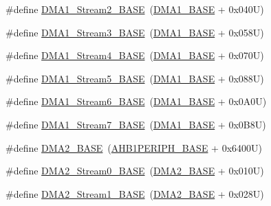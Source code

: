 \begin{DoxyCompactItemize}
\item 
\#define \hyperlink{group___peripheral__memory__map_ga48a551ee91d3f07dd74347fdb35c703d}{D\+M\+A1\+\_\+\+Stream2\+\_\+\+B\+A\+SE}~(\hyperlink{group___peripheral__memory__map_gab2d8a917a0e4ea99a22ac6ebf279bc72}{D\+M\+A1\+\_\+\+B\+A\+SE} + 0x040\+U)
\item 
\#define \hyperlink{group___peripheral__memory__map_gac51deb54ff7cfe1290dfcf517ae67127}{D\+M\+A1\+\_\+\+Stream3\+\_\+\+B\+A\+SE}~(\hyperlink{group___peripheral__memory__map_gab2d8a917a0e4ea99a22ac6ebf279bc72}{D\+M\+A1\+\_\+\+B\+A\+SE} + 0x058\+U)
\item 
\#define \hyperlink{group___peripheral__memory__map_ga757a3c0d866c0fe68c6176156065a26b}{D\+M\+A1\+\_\+\+Stream4\+\_\+\+B\+A\+SE}~(\hyperlink{group___peripheral__memory__map_gab2d8a917a0e4ea99a22ac6ebf279bc72}{D\+M\+A1\+\_\+\+B\+A\+SE} + 0x070\+U)
\item 
\#define \hyperlink{group___peripheral__memory__map_ga0ded7bed8969fe2e2d616e7f90eb7654}{D\+M\+A1\+\_\+\+Stream5\+\_\+\+B\+A\+SE}~(\hyperlink{group___peripheral__memory__map_gab2d8a917a0e4ea99a22ac6ebf279bc72}{D\+M\+A1\+\_\+\+B\+A\+SE} + 0x088\+U)
\item 
\#define \hyperlink{group___peripheral__memory__map_ga58998ddc40adb6361704d6c9dad08125}{D\+M\+A1\+\_\+\+Stream6\+\_\+\+B\+A\+SE}~(\hyperlink{group___peripheral__memory__map_gab2d8a917a0e4ea99a22ac6ebf279bc72}{D\+M\+A1\+\_\+\+B\+A\+SE} + 0x0\+A0\+U)
\item 
\#define \hyperlink{group___peripheral__memory__map_ga82186dd6d3f60995d428b34c041919d7}{D\+M\+A1\+\_\+\+Stream7\+\_\+\+B\+A\+SE}~(\hyperlink{group___peripheral__memory__map_gab2d8a917a0e4ea99a22ac6ebf279bc72}{D\+M\+A1\+\_\+\+B\+A\+SE} + 0x0\+B8\+U)
\item 
\#define \hyperlink{group___peripheral__memory__map_gab72a9ae145053ee13d1d491fb5c1df64}{D\+M\+A2\+\_\+\+B\+A\+SE}~(\hyperlink{group___peripheral__memory__map_ga811a9a4ca17f0a50354a9169541d56c4}{A\+H\+B1\+P\+E\+R\+I\+P\+H\+\_\+\+B\+A\+SE} + 0x6400\+U)
\item 
\#define \hyperlink{group___peripheral__memory__map_gac4c67b24726ba6b94d03adb351bcec4d}{D\+M\+A2\+\_\+\+Stream0\+\_\+\+B\+A\+SE}~(\hyperlink{group___peripheral__memory__map_gab72a9ae145053ee13d1d491fb5c1df64}{D\+M\+A2\+\_\+\+B\+A\+SE} + 0x010\+U)
\item 
\#define \hyperlink{group___peripheral__memory__map_ga35512bdc3f5e9df4557c2fbe7935d0b1}{D\+M\+A2\+\_\+\+Stream1\+\_\+\+B\+A\+SE}~(\hyperlink{group___peripheral__memory__map_gab72a9ae145053ee13d1d491fb5c1df64}{D\+M\+A2\+\_\+\+B\+A\+SE} + 0x028\+U)

\end{DoxyCompactItemize}
